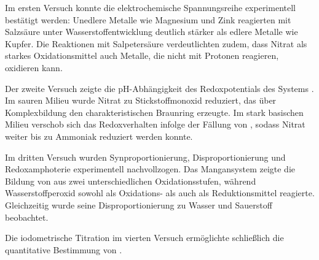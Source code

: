 Im ersten Versuch konnte die elektrochemische Spannungsreihe experimentell bestätigt werden: Unedlere Metalle wie Magnesium und Zink reagierten mit Salzsäure unter Wasserstoffentwicklung deutlich stärker als edlere Metalle wie Kupfer. Die Reaktionen mit Salpetersäure verdeutlichten zudem, dass Nitrat als starkes Oxidationsmittel auch Metalle, die nicht mit Protonen reagieren, oxidieren kann.

Der zweite Versuch zeigte die pH-Abhängigkeit des Redoxpotentials des Systems . Im sauren Milieu wurde Nitrat zu Stickstoffmonoxid reduziert, das über Komplexbildung den charakteristischen Braunring erzeugte. Im stark basischen Milieu verschob sich das Redoxverhalten infolge der Fällung von , sodass Nitrat weiter bis zu Ammoniak reduziert werden konnte.

Im dritten Versuch wurden Synproportionierung, Disproportionierung und Redoxamphoterie experimentell nachvollzogen. Das Mangansystem zeigte die Bildung von  aus zwei unterschiedlichen Oxidationsstufen, während Wasserstoffperoxid sowohl als Oxidations- als auch als Reduktionsmittel reagierte. Gleichzeitig wurde seine Disproportionierung zu Wasser und Sauerstoff beobachtet.

Die iodometrische Titration im vierten Versuch ermöglichte schließlich die quantitative Bestimmung von .